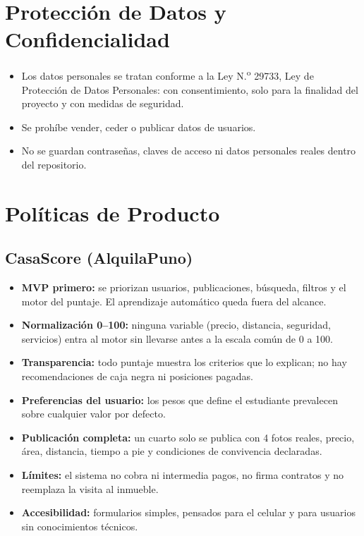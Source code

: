 \documentclass[11pt,a4paper]{article}
\begin{document}
\section{Protección de Datos y Confidencialidad}
\begin{itemize}[leftmargin=*]
    \item Los datos personales se tratan conforme a la Ley N.\textsuperscript{o} 29733, Ley de Protección de Datos Personales: con consentimiento, solo para la finalidad del proyecto y con medidas de seguridad.
    \item Se prohíbe vender, ceder o publicar datos de usuarios.
    \item No se guardan contraseñas, claves de acceso ni datos personales reales dentro del repositorio.
\end{itemize}

\section{Políticas de Producto}

\subsection{CasaScore (AlquilaPuno)}
\begin{itemize}[leftmargin=*]
    \item \textbf{MVP primero:} se priorizan usuarios, publicaciones, búsqueda, filtros y el motor del puntaje. El aprendizaje automático queda fuera del alcance.
    \item \textbf{Normalización 0--100:} ninguna variable (precio, distancia, seguridad, servicios) entra al motor sin llevarse antes a la escala común de 0 a 100.
    \item \textbf{Transparencia:} todo puntaje muestra los criterios que lo explican; no hay recomendaciones de caja negra ni posiciones pagadas.
    \item \textbf{Preferencias del usuario:} los pesos que define el estudiante prevalecen sobre cualquier valor por defecto.
    \item \textbf{Publicación completa:} un cuarto solo se publica con 4 fotos reales, precio, área, distancia, tiempo a pie y condiciones de convivencia declaradas.
    \item \textbf{Límites:} el sistema no cobra ni intermedia pagos, no firma contratos y no reemplaza la visita al inmueble.
    \item \textbf{Accesibilidad:} formularios simples, pensados para el celular y para usuarios sin conocimientos técnicos.
\end{itemize}
\end{document}
